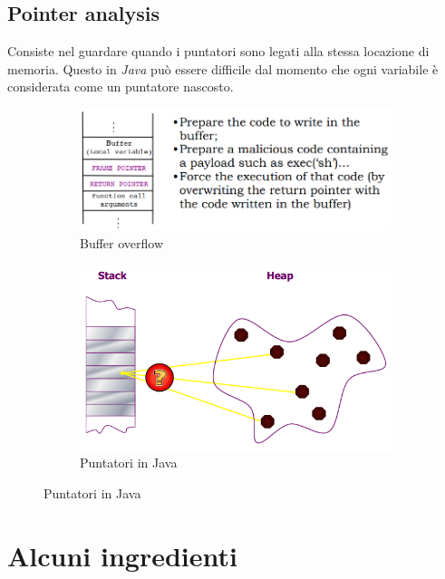 \documentclass[a4paper,oneside,titlepage]{book}
\begin{document}
\subsection{Pointer analysis}
Consiste nel guardare quando i puntatori sono legati alla stessa locazione di memoria. Questo in \textit{Java} può essere difficile dal momento che ogni variabile è considerata come un puntatore nascosto.

\begin{figure}[htp]
	\begin{subfigure}{0.49\textwidth}
	    \centering
		\includegraphics[width=\textwidth, height=\textheight, keepaspectratio]{buffer_overflow.png}
		\caption{Buffer overflow}
	\end{subfigure}
	\hfill
	\begin{subfigure}{0.49\textwidth}
	    \centering
		\includegraphics[width=\textwidth, height=\textheight, keepaspectratio]{java_pointers.png}
		\caption{Puntatori in Java}
	\end{subfigure}
\end{figure}


\section{Alcuni ingredienti} %
\end{document}
